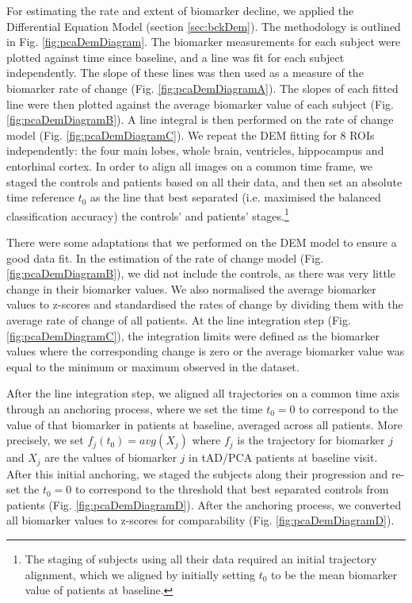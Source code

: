 For estimating the rate and extent of biomarker decline, we applied the Differential Equation Model \cite{villemagne2013amyloid, oxtoby2018} (section \ref{sec:bckDem}). The methodology is outlined in Fig. \ref{fig:pcaDemDiagram}. The biomarker measurements for each subject were plotted against time since baseline, and a line was fit for each subject independently. The slope of these lines was then used as a measure of the biomarker rate of change (Fig. \ref{fig:pcaDemDiagramA}). The slopes of each fitted line were then plotted against the average biomarker value of each subject (Fig. \ref{fig:pcaDemDiagramB}). A line integral is then performed on the rate of change model (Fig. \ref{fig:pcaDemDiagramC}).  We repeat the DEM fitting for 8 ROIs independently: the four main lobes, whole brain, ventricles, hippocampus and entorhinal cortex. In order to align all images on a common time frame, we staged the controls and patients based on all their data, and then set an absolute time reference $t_0$ as the line that best separated (i.e. maximised the balanced classification accuracy) the controls' and patients' stages.\footnote{The staging of subjects using all their data required an initial trajectory alignment, which we aligned by initially setting $t_0$ to be the mean biomarker value of patients at baseline.}

There were some adaptations that we performed on the DEM model to ensure a good data fit. In the estimation of the rate of change model (Fig. \ref{fig:pcaDemDiagramB}), we did not include the controls, as there was very little change in their biomarker values. We also normalised the average biomarker values to z-scores and standardised the rates of change by dividing them with the average rate of change of all patients. At the line integration step (Fig. \ref{fig:pcaDemDiagramC}), the integration limits were defined as the biomarker values where the corresponding change is zero or the average biomarker value was equal to the minimum or maximum observed in the dataset. 

After the line integration step, we aligned all trajectories on a common time axis through an anchoring process, where we set the time $t_0 = 0$ to correspond to the value of that biomarker in patients at baseline, averaged across all patients. More precisely, we set $f_j(t_0) = avg(X_j)$ where $f_j$ is the trajectory for biomarker $j$ and $X_j$ are the values of biomarker $j$ in tAD/PCA patients at baseline visit. After this initial anchoring, we staged the subjects along their progression and re-set the $t_0 = 0$ to correspond to the threshold that best separated controls from patients (Fig. \ref{fig:pcaDemDiagramD}). After the anchoring process, we converted all biomarker values to z-scores for comparability (Fig. \ref{fig:pcaDemDiagramD}).

